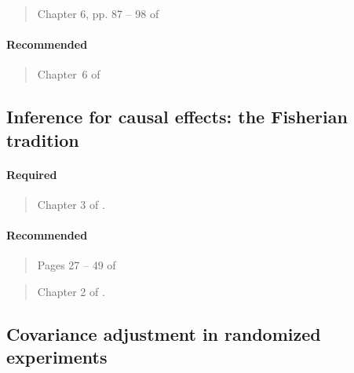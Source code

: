 \documentclass[12pt]{article}
\begin{document}
\begin{verse} Chapter 6, pp. 87 -- 98 of  \end{verse}

\paragraph*{Recommended}

\begin{verse} Chapter~6 of  \end{verse}

\begin{verse}  \end{verse}

\begin{verse}  \end{verse}

\begin{verse}  \end{verse}

\subsection{Inference for causal effects: the Fisherian tradition}

\paragraph*{Required}

\begin{verse}
  Chapter 3 of .
\end{verse}

\paragraph*{Recommended}

\begin{verse}
  Pages 27 -- 49 of 
\end{verse}

\begin{verse}
  Chapter 2 of .
\end{verse}

\subsection{Covariance adjustment in randomized experiments}
\end{document}
